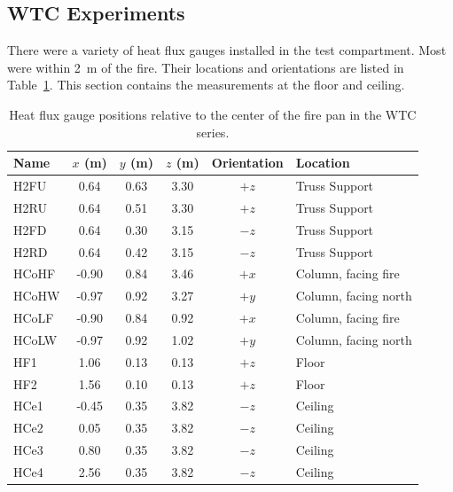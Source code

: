 \clearpage


\subsection{WTC Experiments}

There were a variety of heat flux gauges installed in the test compartment. Most were within 2~m of the fire. Their locations and orientations are listed in Table~\ref{WTC_Gauges}. This section contains the measurements at the floor and ceiling.

\begin{table}[!h]
\caption{Heat flux gauge positions relative to the center of the fire pan in the WTC series.}
\begin{center}
\begin{tabular}{|l|c|c|c|c|l|}
\hline
Name    & $x$ (m)   & $y$ (m) & $z$ (m)   & Orientation  & Location              \\ \hline \hline
H2FU    & 0.64      & 0.63    & 3.30      &     $+z$     & Truss Support         \\ \hline
H2RU    & 0.64      & 0.51    & 3.30      &     $+z$     & Truss Support         \\ \hline
H2FD    & 0.64      & 0.30    & 3.15      &     $-z$     & Truss Support         \\ \hline
H2RD    & 0.64      & 0.42    & 3.15      &     $-z$     & Truss Support         \\ \hline
HCoHF   & -0.90     & 0.84    & 3.46      &     $+x$     & Column, facing fire   \\ \hline
HCoHW   & -0.97     & 0.92    & 3.27      &     $+y$     & Column, facing north  \\ \hline
HCoLF   & -0.90     & 0.84    & 0.92      &     $+x$     & Column, facing fire   \\ \hline
HCoLW   & -0.97     & 0.92    & 1.02      &     $+y$     & Column, facing north  \\ \hline
HF1     & 1.06      & 0.13    & 0.13      &     $+z$     & Floor                 \\ \hline
HF2     & 1.56      & 0.10    & 0.13      &     $+z$     & Floor                 \\ \hline
HCe1    & -0.45     & 0.35    & 3.82      &     $-z$     & Ceiling               \\ \hline
HCe2    &  0.05     & 0.35    & 3.82      &     $-z$     & Ceiling               \\ \hline
HCe3    &  0.80     & 0.35    & 3.82      &     $-z$     & Ceiling               \\ \hline
HCe4    &  2.56     & 0.35    & 3.82      &     $-z$     & Ceiling               \\ \hline
\end{tabular}
\end{center}
\label{WTC_Gauges}
\end{table}

